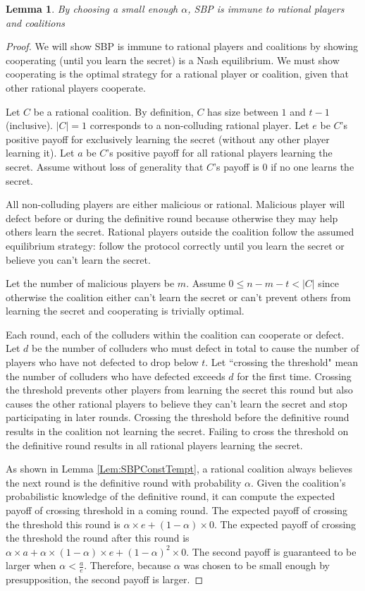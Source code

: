 \documentclass{dalcsthesis}
\newtheorem{lemma}{Lemma}
\begin{document}
\begin{lemma}\label{Lem:SBPRatNash}By choosing a small enough $\alpha$, SBP is immune to rational players and coalitions\end{lemma}
\begin{proof}
We will show SBP is immune to rational players and coalitions by showing cooperating (until you learn the secret) is a Nash equilibrium. We must show cooperating is the optimal strategy for a rational player or coalition, given that other rational players cooperate.

Let $C$ be a rational coalition. By definition, $C$ has size between $1$ and $t-1$ (inclusive). $|C| = 1$ corresponds to a non-colluding rational player. Let $e$ be $C$'s positive payoff for exclusively learning the secret (without any other player learning it). Let $a$ be $C$'s positive payoff for all rational players learning the secret. Assume without loss of generality that $C$'s payoff is 0 if no one learns the secret.

All non-colluding players are either malicious or rational. Malicious player will defect before or during the definitive round because otherwise they may help others learn the secret. Rational players outside the coalition follow the assumed equilibrium strategy: follow the protocol correctly until you learn the secret or believe you can't learn the secret.

Let the number of malicious players be $m$. Assume $0 \leq n - m - t < |C|$ since otherwise the coalition either can't learn the secret or can't prevent others from learning the secret and cooperating is trivially optimal.

Each round, each of the colluders within the coalition can cooperate or defect. Let $d$ be the number of colluders who must defect in total to cause the number of players who have not defected to drop below $t$. Let ``crossing the threshold" mean the number of colluders who have defected exceeds $d$ for the first time. Crossing the threshold prevents other players from learning the secret this round but also causes the other rational players to believe they can't learn the secret and stop participating in later rounds. Crossing the threshold before the definitive round results in the coalition not learning the secret. Failing to cross the threshold on the definitive round results in all rational players learning the secret.

As shown in Lemma \ref{Lem:SBPConstTempt}, a rational coalition always believes the next round is the definitive round with probability $\alpha$. Given the coalition's probabilistic knowledge of the definitive round, it can compute the expected payoff of crossing threshold in a coming round. The expected payoff of crossing the threshold this round is $\alpha \times e + (1-\alpha) \times 0$. The expected payoff of crossing the threshold the round after this round is $\alpha \times a + \alpha \times (1-\alpha) \times e + (1-\alpha)^2 \times 0$. The second payoff is guaranteed to be larger when $\alpha < \frac{a}{e}$. Therefore, because $\alpha$ was chosen to be small enough by presupposition, the second payoff is larger.


\end{proof}
\end{document}
